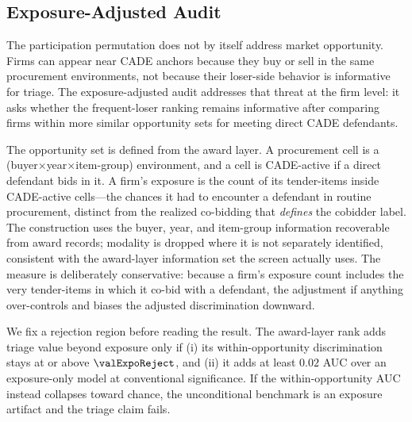 \subsection{Exposure-Adjusted Audit}
\label{app:market_opportunity_submission}

The participation permutation does not by itself address market
opportunity. Firms can appear near CADE anchors because they buy
or sell in the same procurement environments, not because their
loser-side behavior is informative for triage. The
exposure-adjusted audit addresses that threat at the firm level:
it asks whether the frequent-loser ranking remains informative
after comparing firms within more similar opportunity sets for
meeting direct CADE defendants.

The opportunity set is defined from the award layer. A
procurement cell is a (buyer$\times$year$\times$item-group)
environment, and a cell is CADE-active if a direct defendant bids
in it. A firm's exposure is the count of its tender-items inside
CADE-active cells---the chances it had to encounter a defendant
in routine procurement, distinct from the realized co-bidding
that \emph{defines} the cobidder label. The construction uses the
buyer, year, and item-group information recoverable from award
records; modality is dropped where it is not separately
identified, consistent with the award-layer information set the
screen actually uses. The measure is deliberately conservative:
because a firm's exposure count includes the very tender-items in
which it co-bid with a defendant, the adjustment if anything
over-controls and biases the adjusted discrimination downward.

We fix a rejection region before reading the result. The
award-layer rank adds triage value beyond exposure only if (i)
its within-opportunity discrimination stays at or above
$\valExpoReject$, and (ii) it adds at least $0.02$ AUC over an
exposure-only model at conventional significance. If the
within-opportunity AUC instead collapses toward chance, the
unconditional benchmark is an exposure artifact and the
triage claim fails.


